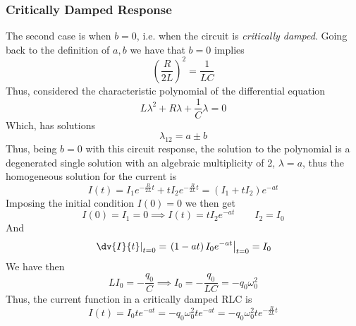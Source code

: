 \documentclass[../electromagnetism.tex]{subfiles}
\begin{document}
\subsubsection{Critically Damped Response}
The second case is when $b=0$, i.e. when the circuit is \textit{critically damped}. Going back to the definition of $a, b$ we have that $b=0$ implies
\begin{equation*}
	\left( \frac{R}{2L} \right)^2=\frac{1}{LC}
\end{equation*}
Thus, considered the characteristic polynomial of the differential equation
\begin{equation*}
	L\lambda^2+R\lambda+\frac{1}{C}\lambda=0
\end{equation*}
Which, has solutions 
\begin{equation*}
	\lambda_{12}=a\pm b
\end{equation*}
Thus, being $b=0$ with this circuit response, the solution to the polynomial is a degenerated single solution with an algebraic multiplicity of 2, $\lambda=a$, thus the homogeneous solution for the current is
\begin{equation}
	I(t)=I_1e^{-\frac{R}{2L}t}+tI_2e^{-\frac{R}{2L}t}=\left( I_1+tI_2 \right)e^{-at}
	\label{eq:critdampIho.rlc}
\end{equation}
Imposing the initial condition $I(0)=0$ we then get
\begin{equation*}
	I(0)=I_1=0\implies I(t)=tI_2e^{-at}\qquad I_2=I_0
\end{equation*}
And
\begin{equation*}
	\left.\dv{I}{t}\right|_{t=0}=\left.\left( 1-at \right)I_0e^{-at}\right|_{t=0}=I_0
\end{equation*}
We have then 
\begin{equation*}
	LI_0=-\frac{q_0}{C}\implies I_0=-\frac{q_0}{LC}=-q_0\omega_0^2
\end{equation*}
Thus, the current function in a critically damped RLC is
\begin{equation}
	I(t)=I_0te^{-at}=-q_0\omega_0^2te^{-at}=-q_0\omega_0^2te^{-\frac{R}{2L}t}
	\label{eq:criticaldamp.rlc}
\end{equation}
\end{document}
